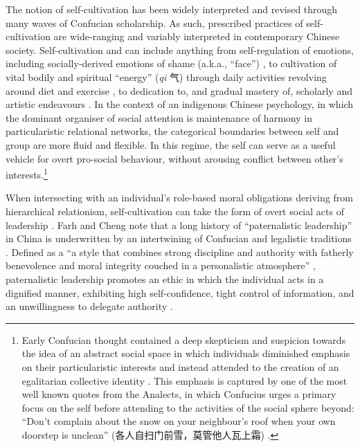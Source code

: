 \begin{CJK}{UTF8}{gbsn}
The notion of self-cultivation has been widely interpreted and revised through many waves of Confucian scholarship. As such, prescribed practices of self-cultivation are wide-ranging and variably interpreted in contemporary Chinese society.  Self-cultivation and can include anything from self-regulation of emotions, including socially-derived emotions of shame (a.k.a., ``face'') \citep{Matsumoto2012}, to cultivation of vital bodily and spiritual ``energy'' (\textit{qi} 气) through daily activities revolving around diet and exercise \citep{Farquhar2012}, to dedication to, and gradual mastery of, scholarly and artistic endeavours \citep{Slingerland2000}.
In the context of an indigenous Chinese psychology, in which the dominant organiser of social attention is maintenance of harmony in particularistic relational networks, the categorical boundaries between self and group are more fluid and flexible.  In this regime, the self can serve as a useful vehicle for overt pro-social behaviour, without arousing conflict between other's interests.\footnote{Early Confucian thought contained a deep skepticism and suspicion towards the idea of an abstract social space in which individuals diminished emphasis on their particularistic interests and instead attended to the creation of an egalitarian collective identity \citep{Bollas2013}.  This emphasis is captured by one of the most well known quotes from the Analects, in which Confucius urges a primary focus on the self before attending to the activities of the social sphere beyond: ``Don’t complain about the snow on your neighbour’s roof when your own doorstep is unclean''
(各人自扫门前雪，莫管他人瓦上霜) \citep{Leys1997}.}

When intersecting with an individual's role-based moral obligations deriving from hierarchical relationism, self-cultivation can take the form of overt social acts of leadership \citep{Woods2011}.  Farh and Cheng note that a long history of ``paternalistic leadership'' in China is underwritten by an intertwining of Confucian and legalistic traditions \citep{Farh2000}.  Defined as a ``a style that combines strong discipline and authority with fatherly benevolence and moral integrity couched in a personalistic atmosphere'' \citep[91]{Cheng2004}, paternalistic leadership promotes an ethic in which the individual acts in a dignified manner, exhibiting high self-confidence, tight control of information, and an unwillingness to delegate authority \citep{Liu2003}.







\end{CJK}
